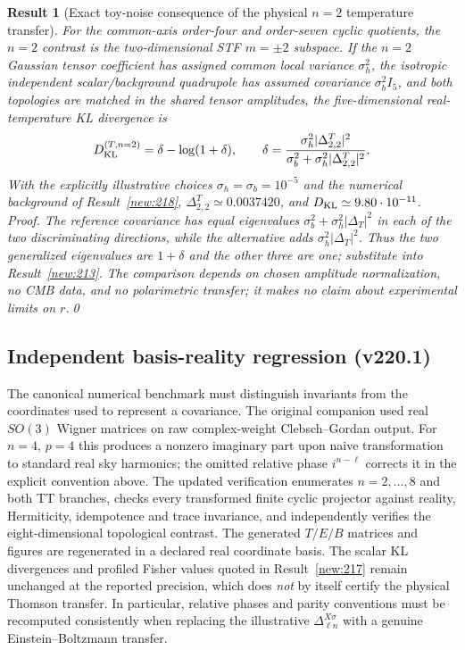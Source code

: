 \documentclass[aps,prd,onecolumn,notitlepage,groupedaddress,11pt]{revtex4-2}
\newtheorem{result}{Result}
\begin{document}
\begin{result}[\textsf{Exact toy-noise consequence of the physical $n=2$ temperature transfer}]\label{new:220}
For the common-axis order-four and order-seven cyclic quotients, the $n=2$ contrast is the two-dimensional STF $m=\pm2$ subspace. If the $n=2$ Gaussian tensor coefficient has assigned common local variance $\sigma_h^2$, the isotropic independent scalar/background quadrupole has assumed covariance $\sigma_b^2 I_5$, and both topologies are matched in the shared tensor amplitudes, the five-dimensional real-temperature KL divergence is
\begin{equation}\label{eq:physicaln2KL}
D_{\rm KL}^{(T,n=2)}=\delta-\log(1+\delta),\qquad
\delta=\frac{\sigma_h^2|\Delta^T_{2,2}|^2}{\sigma_b^2+\sigma_h^2|\Delta^T_{2,2}|^2}.
\end{equation}
With the explicitly \emph{illustrative} choices $\sigma_h=\sigma_b=10^{-5}$ and the numerical background of Result~\ref{new:218}, $\Delta^T_{2,2}\simeq0.0037420$, and $D_{\rm KL}\simeq9.80\cdot10^{-11}$. \textit{Proof.} The reference covariance has equal eigenvalues $\sigma_b^2+\sigma_h^2|\Delta_T|^2$ in each of the two discriminating directions, while the alternative adds $\sigma_h^2|\Delta_T|^2$. Thus the two generalized eigenvalues are $1+\delta$ and the other three are one; substitute into Result~\ref{new:213}. The comparison depends on chosen amplitude normalization, no CMB data, and no polarimetric transfer; it makes no claim about experimental limits on $r$.\qed
\end{result}

\subsection*{Independent basis-reality regression (v220.1)}
The canonical numerical benchmark must distinguish invariants from the
coordinates used to represent a covariance. The original companion used
real $SO(3)$ Wigner matrices on raw complex-weight Clebsch--Gordan output.
For $n=4$, $p=4$ this produces a nonzero imaginary part upon naive
transformation to standard real sky harmonics; the omitted relative
phase $i^{n-\ell}$ corrects it in the explicit convention above.
The updated verification enumerates $n=2,\ldots,8$ and both TT branches,
checks every transformed finite cyclic projector against reality,
Hermiticity, idempotence and trace invariance, and independently verifies
the eight-dimensional topological contrast. The generated $T/E/B$
matrices and figures are regenerated in a declared real coordinate basis.
The scalar KL divergences and profiled Fisher values quoted in
Result~\ref{new:217} remain unchanged at the reported precision,
which does \emph{not} by itself certify the physical Thomson transfer.
In particular, relative phases and parity conventions must be recomputed
consistently when replacing the illustrative $\Delta^{X\sigma}_{\ell n}$
with a genuine Einstein--Boltzmann transfer.
\end{document}
